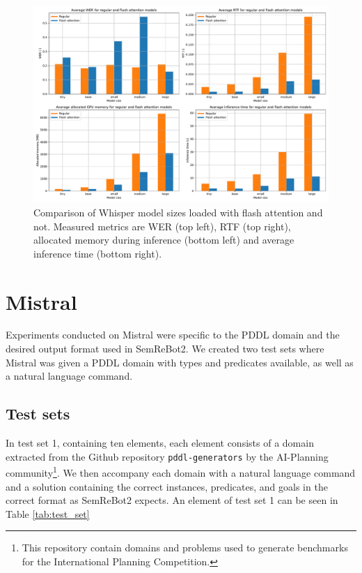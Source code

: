 \begin{figure}[h]
    \centering
    \includegraphics[width=\textwidth]{figures/avg.pdf}
    \caption[Whisper experiment results]{Comparison of Whisper model sizes loaded with flash attention and not. Measured metrics are WER (top left), RTF (top right), allocated memory during inference (bottom left) and average inference time (bottom right).}
    \label{fig:whisper_avg}
\end{figure}

\section{Mistral}\label{sec:Mistral_experiments}
Experiments conducted on Mistral were specific to the PDDL domain and the desired output format used in SemReBot2. We created two test sets where Mistral was given a PDDL domain with types and predicates available, as well as a natural language command.

\subsection{Test sets}
In test set 1, containing ten elements, each element consists of a domain extracted from the Github repository \verb|pddl-generators| by the AI-Planning community\cite{favorito_ai-planningpddl-generators_2024}\footnote{This repository contain domains and problems used to generate benchmarks for the International Planning Competition.}. We then accompany each domain with a natural language command and a solution containing the correct instances, predicates, and goals in the correct format as SemReBot2 expects. An element of test set 1 can be seen in Table \ref{tab:test_set}

